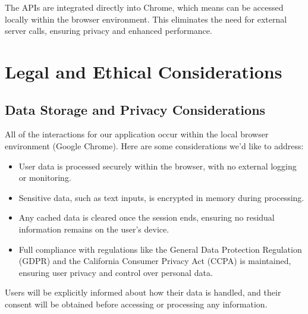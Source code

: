\documentclass{article}
\begin{document}
The APIs are integrated directly into Chrome, which means can be accessed locally within the browser environment. This eliminates the need for external server calls, ensuring privacy and enhanced performance.

\section{Legal and Ethical Considerations}
\subsection{Data Storage and Privacy Considerations}
All of the interactions for our application occur within the local browser environment (Google Chrome). Here are some considerations we'd like to address:
\begin{itemize}
    \item User data is processed securely within the browser, with no external logging or monitoring.
    \item Sensitive data, such as text inputs, is encrypted in memory during processing.
    \item Any cached data is cleared once the session ends, ensuring no residual information remains on the user’s device.
    \item Full compliance with regulations like the General Data Protection Regulation (GDPR) and the California Consumer Privacy Act (CCPA) is maintained, ensuring user privacy and control over personal data.
\end{itemize}
Users will be explicitly informed about how their data is handled, and their consent will be obtained before accessing or processing any information.
\end{document}
